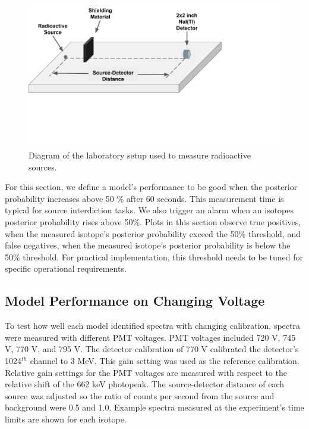 \begin{figure}[H]
	\centering
	\includegraphics[trim=0 200 210 0,clip,width=0.9\linewidth]{images/shielding_measurment_diagram}
	\caption{Diagram of the laboratory setup used to measure radioactive sources.}
	\label{fig:shielding_measurment_diagram}
\end{figure}

For this section, we define a model's performance to be good when the posterior probability increases above 50 \% after 60 seconds. This measurement time is typical for source interdiction tasks. We also trigger an alarm when an isotopes posterior probability rises above 50\%. Plots in this section observe true positives, when the measured isotope's posterior probability exceed the 50\% threshold, and false negatives, when the measured isotope's posterior probability is below the 50\% threshold. For practical implementation, this threshold needs to be tuned for specific operational requirements. 


\subsection{Model Performance on Changing Voltage} \label{real_calibration_performance}

To test how well each model identified spectra with changing calibration, spectra were measured with different PMT voltages. PMT voltages included 720 V, 745 V, 770 V, and 795 V. The detector calibration of 770 V calibrated the detector's 1024$^{th}$ channel to 3 MeV. This gain setting was used as the reference calibration. Relative gain settings for the PMT voltages are measured with respect to the relative shift of the 662 keV photopeak. The source-detector distance of each source was adjusted so the ratio of counts per second from the source and background were 0.5 and 1.0. Example spectra measured at the experiment's time limits are shown for each isotope.

